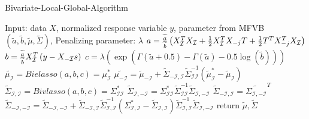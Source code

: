 \newpage
\begin{algorithm}
	\caption{Bivariate-Local-Global-Algorithm}
	\begin{algorithmic}[1]
		
		\State Input: data $X$, normalized response variable $y$, parameter from MFVB $(\tilde{a},\tilde{b},\tilde{\mu},\tilde{\Sigma})$, Penalizing parameter: $\lambda$
		\State $a = \frac{\widetilde{a}}{\widetilde{b}} \left(X_{\mathcal I}^TX_{\mathcal I} + \tfrac{1}{2}X_{\mathcal I}^TX_{-j}T + \tfrac{1}{2}T^T X_{-j}^T X_{\mathcal I} \right)$ 
		\State $b = \frac{\widetilde{a}}{\widetilde{b}} X_{\mathcal I}^T\left( y - X_{-{\mathcal I}}s \right) $ 
		\State $c = \lambda (\exp(\Gamma(\tilde{a}+0.5) - \Gamma(\tilde{a}) - 0.5\log(\tilde{b})))  $ 
		\State $\tilde{\mu_{\mathcal{I}}} =  Bielasso(a,b,c) = \mu_\mathcal{I} ^*$ 
		\State $\tilde{\mu_{-\mathcal{I}}} = \tilde{\mu}_{-\mathcal{I}} +  \tilde{\Sigma}_{-\mathcal{I},\mathcal{I}}\tilde{\Sigma}^{-1}_{\mathcal{I}\mathcal{I}}(\tilde{\mu}_\mathcal{I}^*-\tilde{\mu}_\mathcal{I})$ 
		\State $\tilde{\Sigma}_{\mathcal{I},\mathcal{I}} = Bivlasso(a,b,c) = \Sigma_{\mathcal{I}\mathcal{I}}^*$ 
		\State $\tilde{\Sigma}_{\mathcal{I},-\mathcal{I}} = \Sigma_{\mathcal{I}\mathcal{I}}^*  \tilde{\Sigma}_{\mathcal{I}\mathcal{I}}^{-1}\tilde{\Sigma}_{\mathcal{I},-\mathcal{I}} $ 
		\State $\tilde{\Sigma}_{-\mathcal{I},\mathcal{I}} = \tilde{\Sigma_{\mathcal{I},-\mathcal{I}}}^T$ 
		\State $\tilde{\Sigma}_{-\mathcal{I},-\mathcal{I}} = \tilde{\Sigma}_{-\mathcal{I},-\mathcal{I}} + \tilde{\Sigma}_{-\mathcal{I},\mathcal{I}}\tilde{\Sigma}_{\mathcal{I},\mathcal{I}}^{-1}(\Sigma_{\mathcal{I},\mathcal{I}}^{*} - \tilde{\Sigma}_{\mathcal{I},\mathcal{I}})\tilde{\Sigma}_{\mathcal{I},\mathcal{I}}^{-1}\tilde{\Sigma}_{\mathcal{I},-\mathcal{I}}$ 		
		\EndFor
		\EndWhile
		\State return $\tilde{\mu},\tilde{\Sigma}$
	\end{algorithmic}
\end{algorithm}

